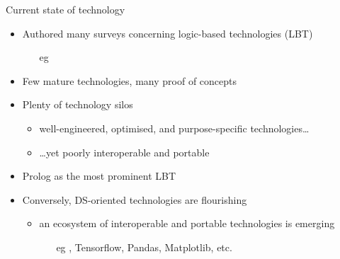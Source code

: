 \documentclass[presentation]{beamer}\mode<presentation>{\usetheme{AMSBolognaFC}}
\begin{document}
\begin{frame}{Current state of technology}
    \begin{itemize}

        \item Authored many \alert{surveys} concerning \alert{logic-based technologies} (LBT)
        \begin{itemize}
            \item[eg] 
        \end{itemize}
        
        \vfill

        \item \alert{Few} mature technologies, \alert{many} proof of concepts
        
        \vfill

        \item Plenty of technology \alert{silos}
        \begin{itemize}
            \item well-engineered, optimised, and \alert{purpose-specific} technologies\ldots
            \item \dots yet \alert{poorly interoperable} and portable
        \end{itemize}
        
        \vfill

        \item \alert{Prolog} as the most prominent LBT
        
        \vfill

        \item Conversely, DS-oriented technologies are flourishing
        \begin{itemize}
            \item an \alert{ecosystem} of interoperable and portable technologies is \alert{emerging}
            \begin{itemize}
                \item[eg] \scikit{}, Tensorflow, Pandas, Matplotlib, etc.
            \end{itemize}
        \end{itemize}
    \end{itemize}
\end{frame}
\end{document}
